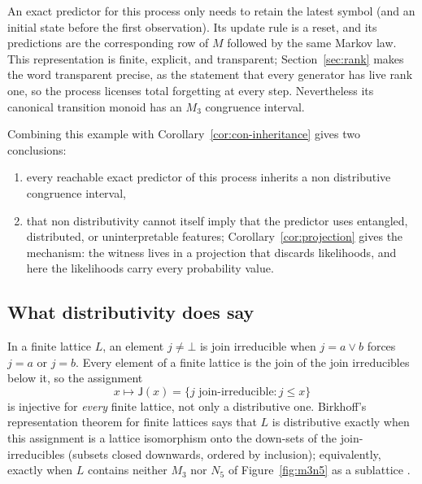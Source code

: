\documentclass[10pt]{article}
\theoremstyle{definition}
\theoremstyle{remark}
\newcommand{\join}{\vee}
\newcommand{\J}{\mathsf{J}}
\begin{document}
An exact predictor for this process only needs to retain the latest symbol (and
an initial state before the first observation).  Its update rule is a reset, and
its predictions are the corresponding row of $M$ followed by the same Markov
law.  This representation is finite,
explicit, and transparent; Section~\ref{sec:rank} makes the word
transparent precise, as the statement that every generator has live
rank one, so the process licenses total forgetting at every step.
Nevertheless its canonical transition monoid has an $M_3$ congruence
interval.

Combining this example with Corollary~\ref{cor:con-inheritance} gives two
conclusions:
\begin{enumerate}[label=(\roman*)]
  \item every reachable exact predictor of this process inherits a
        non distributive congruence interval,
  \item that non distributivity cannot itself imply that the predictor uses
        entangled, distributed, or uninterpretable features;
        Corollary~\ref{cor:projection} gives the mechanism: the witness
        lives in a projection that discards likelihoods, and here the
        likelihoods carry every probability value.
\end{enumerate}


\subsection{What distributivity does say}
\label{sec:coordinates}

In a finite
lattice $L$, an element $j\ne\bot$ is join irreducible when
$j=a\join b$ forces $j=a$ or $j=b$.  Every element of a finite lattice
is the join of the join irreducibles below it, so the assignment
\[
  x\longmapsto\J(x)=\{j\text{ join-irreducible}:j\le x\}
\]
is injective for \emph{every} finite lattice, not only a distributive
one.  Birkhoff's representation theorem for finite lattices says that
$L$ is distributive exactly when this assignment is a lattice
isomorphism onto the down-sets of the join-irreducibles (subsets
closed downwards, ordered by inclusion); equivalently, exactly when
$L$ contains neither $M_3$ nor $N_5$ of Figure~\ref{fig:m3n5} as a
sublattice \cite{DaveyPriestley2002}.
\end{document}
